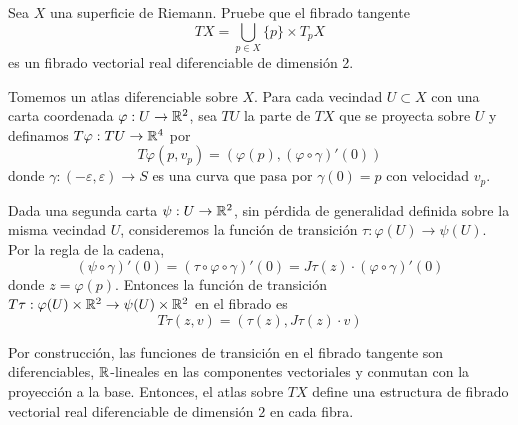 \begin{exercise}
Sea $X$ una superficie de Riemann. Pruebe que el fibrado tangente
$$TX = \bigcup_{p \in X} \{ p \} \times T_pX$$
es un fibrado vectorial real diferenciable de dimensión 2.
\end{exercise}

\begin{solution}
Tomemos un atlas diferenciable sobre $X$. Para cada vecindad $U \subset X$ con una carta coordenada $\varphi : U \to \mathbb R^2$, sea $TU$ la parte de $TX$ que se proyecta sobre $U$ y definamos $T\varphi : TU \to \mathbb R^4$ por
$$T\varphi(p, v_p) = (\varphi(p), (\varphi \circ \gamma)'(0))$$
donde $\gamma : (-\varepsilon, \varepsilon) \to S$ es una curva que pasa por $\gamma(0) = p$ con velocidad $v_p$.

Dada una segunda carta $\psi : U \to \mathbb R^2$, sin pérdida de generalidad definida sobre la misma vecindad $U$, consideremos la función de transición $\tau : \varphi(U) \to \psi(U)$. Por la regla de la cadena,
$$(\psi \circ \gamma)'(0) = (\tau \circ \varphi \circ \gamma)'(0) = J\tau(z) \cdot (\varphi \circ \gamma)'(0)$$
donde $z = \varphi(p)$. Entonces la función de transición $T\tau : \varphi(U) \times \mathbb R^2 \to \psi(U) \times \mathbb R^2$ en el fibrado es
$$T\tau(z, v) = (\tau(z), J\tau(z) \cdot v)$$

Por construcción, las funciones de transición en el fibrado tangente son diferenciables, $\mathbb R$-lineales en las componentes vectoriales y conmutan con la proyección a la base. Entonces, el atlas sobre $TX$ define una estructura de fibrado vectorial real diferenciable de dimensión $2$ en cada fibra.
\end{solution}

